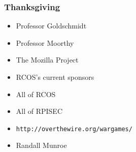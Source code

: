 \documentclass{beamer}
\begin{document}
\begin{frame}[fragile]
\frametitle{Thanksgiving}
\begin{itemize}
\item Professor Goldschmidt
\item Professor Moorthy
\item The Mozilla Project
\item RCOS's current sponsors
\item All of RCOS
\item All of RPISEC
\item \verb|http://overthewire.org/wargames/|
\item Randall Munroe
\end{itemize}
\end{frame}
\end{document}
